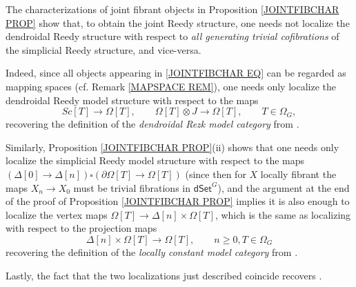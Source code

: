 \documentclass[a4paper,10pt
 ,draft
]{article}%
\begin{document}
\begin{remark}\label{RECOVDEF REM}
The characterizations of joint fibrant objects in Proposition \ref{JOINTFIBCHAR PROP} show that, to obtain the joint Reedy structure, 
one needs not localize the dendroidal Reedy structure with respect to \emph{all generating trivial cofibrations}
of the simplicial Reedy structure, and vice-versa. 

Indeed, since all objects appearing in 
\eqref{JOINTFIBCHAR EQ}
can be regarded as mapping spaces (cf. Remark \ref{MAPSPACE REM}), 
one needs only localize the dendroidal Reedy model structure with respect to the maps
\[
Sc[T] \to \Omega[T], \qquad \Omega[T] \otimes J \to \Omega[T], \qquad T \in \Omega_G,
\]
recovering 
the definition of the \emph{dendroidal Rezk model category} %
from \cite[Defs. 5.4, 6.2]{CM13a}.

Similarly, Proposition \ref{JOINTFIBCHAR PROP}(ii) shows that one needs only localize the simplicial Reedy model structure with respect to the maps
$(\Delta[0] \to \Delta[n])\square (\partial \Omega[T] \to \Omega[T])$ (since then for $X$ locally fibrant the maps $X_n \to X_0$ must be trivial fibrations in $\mathsf{dSet}^G$), and the argument at the end of the proof of Proposition \ref{JOINTFIBCHAR PROP}
implies it is also enough to localize the vertex maps 
$\Omega[T] \to \Delta[n] \times \Omega[T]$, which is the same as localizing with respect to the projection maps
\[\Delta[n] \times \Omega[T] \to \Omega[T],
\qquad n\geq 0, T \in \Omega_G\]
recovering
the definition of the \emph{locally constant model category} %
from \cite[Def. 4.6]{CM13a}.

Lastly, the fact that the two localizations just described coincide recovers \cite[Thm. 6.6]{CM13a}.
\end{remark}
\end{document}
